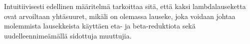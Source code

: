 Intuitiivisesti edellinen määritelmä tarkoittaa sitä, että kaksi lambdalauseketta ovat arvoiltaan yhtäsuuret, mikäli on olemassa lauseke, joka voidaan johtaa molemmista lausekkeista käyttäen eta- ja beta-reduktiota sekä uudelleennimeämällä sidottuja muuttujia. 


 
